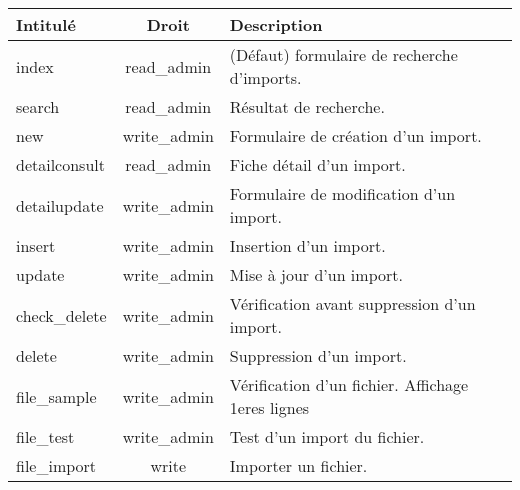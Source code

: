 \begin{tabular}{|l|c|p{9.5cm}|}
 \hline
 \textbf{Intitulé} & \textbf{Droit} & \textbf{Description} \\
 \hline
 \hline
  index & read\_admin & (Défaut) formulaire de recherche d'imports. \\ 
 \hline
  search & read\_admin & Résultat de recherche. \\
 \hline
  new & write\_admin & Formulaire de création d'un import. \\
 \hline
  detailconsult & read\_admin & Fiche détail d'un import. \\
 \hline
  detailupdate & write\_admin & Formulaire de modification d'un import. \\
 \hline
  insert & write\_admin & Insertion d'un import. \\
 \hline
  update & write\_admin & Mise à jour d'un import. \\
 \hline
  check\_delete & write\_admin & Vérification avant suppression d'un import. \\
 \hline
  delete & write\_admin & Suppression d'un import. \\
 \hline
  file\_sample & write\_admin & Vérification d'un fichier. Affichage 1eres lignes\\
 \hline
  file\_test & write\_admin & Test d'un import du fichier. \\
 \hline
  file\_import & write & Importer un fichier. \\
 \hline
\end{tabular}
